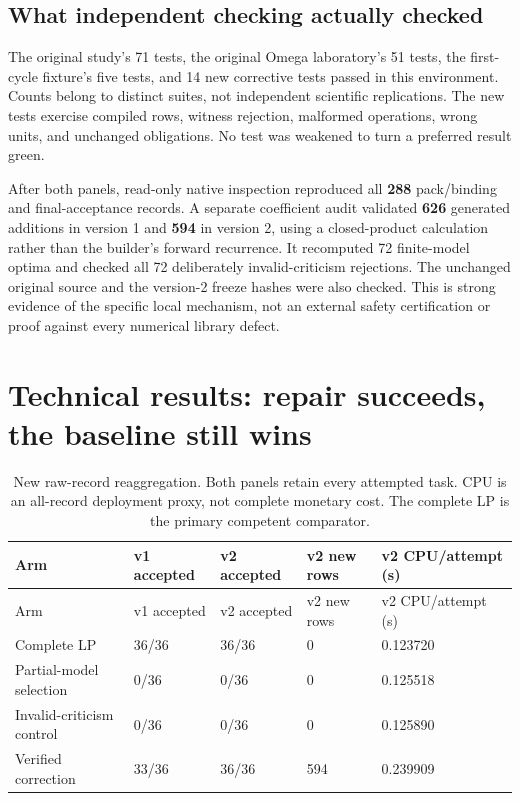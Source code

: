 \subsection{What independent checking actually
checked}\label{what-independent-checking-actually-checked}

The original study's 71 tests, the original Omega laboratory's 51 tests,
the first-cycle fixture's five tests, and 14 new corrective tests passed
in this environment. Counts belong to distinct suites, not independent
scientific replications. The new tests exercise compiled rows, witness
rejection, malformed operations, wrong units, and unchanged obligations.
No test was weakened to turn a preferred result green.

After both panels, read-only native inspection reproduced all
\textbf{288} pack/binding and final-acceptance records. A separate
coefficient audit validated \textbf{626} generated additions in version
1 and \textbf{594} in version 2, using a closed-product calculation
rather than the builder's forward recurrence. It recomputed 72
finite-model optima and checked all 72 deliberately invalid-criticism
rejections. The unchanged original source and the version-2 freeze
hashes were also checked. This is strong evidence of the specific local
mechanism, not an external safety certification or proof against every
numerical library defect.

\section{Technical results: repair succeeds, the baseline still
wins}\label{technical-results}

\begin{longtable}[]{@{}lllll@{}}
\caption{New raw-record reaggregation. Both panels retain every
attempted task. CPU is an all-record deployment proxy, not complete
monetary cost. The complete LP is the primary competent
comparator.}\tabularnewline
\toprule\noalign{}
Arm & v1 accepted & v2 accepted & v2 new rows & v2 CPU/attempt (s) \\
\midrule\noalign{}
\endfirsthead
\toprule\noalign{}
Arm & v1 accepted & v2 accepted & v2 new rows & v2 CPU/attempt (s) \\
\midrule\noalign{}
\endhead
\bottomrule\noalign{}
\endlastfoot
Complete LP & 36/36 & 36/36 & 0 & 0.123720 \\
Partial-model selection & 0/36 & 0/36 & 0 & 0.125518 \\
Invalid-criticism control & 0/36 & 0/36 & 0 & 0.125890 \\
Verified correction & 33/36 & 36/36 & 594 & 0.239909 \\
\end{longtable}

